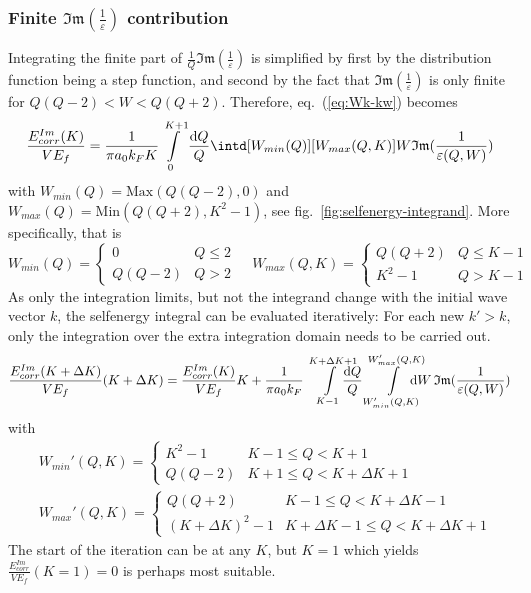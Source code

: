 \documentclass[physics,phd,nolot,nolof]{uccthesis}%
\begin{document}
{\subsubsection{Finite $\mathfrak{Im}(\frac{1}{\varepsilon})$ contribution}
Integrating the finite part of  $\frac{1}{Q}\mathfrak{Im}(\frac{1}{\varepsilon})$ is 
simplified by first by the distribution function being a step function,
and second by the fact that $\mathfrak{Im}(\frac{1}{\varepsilon})$ 
is only finite for $Q (Q-2) < W< Q(Q+2)$. 
Therefore, eq.~(\ref{eq:Wk-kw}) becomes
\begin{equation}
  \frac{ E_{corr}^{Im}(K)}{V E_f}= 
  \frac{1}{\pi a_0 k_F K} 
  \int\limits_{0}^{K+1}\frac{\mathrm{d}Q}{Q}
  \intd[W_{min}(Q)][W_{max}(Q,K)]W
  \mathfrak{Im}(\frac{1}{\varepsilon(Q,W)})
  \label{eq:Wk-T=0-finite}
\end{equation}
with 
$W_{min}(Q)= \text{Max}(Q(Q-2),0)$
and
$W_{max}(Q)= \text{Min}(Q(Q+2),K^2-1)$, see fig.~\ref{fig:selfenergy-integrand}.
More specifically, that is
\begin{equation}
  W_{min}(Q) =
  	\begin{cases}
	  	0	&	Q \leq 2\\
		Q(Q-2)	&	Q >2
  	\end{cases}
	\;\;\;\;
  W_{max}(Q,K) =
  	\begin{cases}
	  	Q(Q+2)	&	Q \leq K-1\\
		K^2-1	&	Q >K-1
  	\end{cases}
  \label{eq:wmin-max-T=0-finite-iminveps}
\end{equation}
As only the integration limits, but not the integrand change with the initial 
wave vector $k$, the selfenergy integral can be evaluated iteratively:
For each new $k'>k$, only the integration over the extra integration domain
needs to be carried out. 
\begin{equation}
  \frac{ E_{corr}^{Im}(K+\Delta K)}{V E_f}(K+\Delta K) = 
  \frac{ E_{corr}^{Im}(K)}{V E_f}K + 
  \frac{1}{\pi a_0 k_F} 
  \int\limits_{K-1}^{K+\Delta K+1}\mkern-20mu\frac{\mathrm{d}Q}{Q}
  \int\limits_{W_{min}'(Q,K)}^{W_{max}'(Q,K)}\mkern-20mu\mathrm{d}W\,
  \mathfrak{Im}(\frac{1}{\varepsilon(Q,W)})
  \label{eq:Wk-T=0-finite-iterative}
\end{equation}
with 
\begin{equation}
  \begin{split}
& W_{min}'(Q,K) =
  	\begin{cases}
	K^2-1	&	K-1 \leq Q < K+1\\
	Q(Q-2)	&	K+1 \leq Q < K+\Delta K+1
  	\end{cases}
	\\
& W_{max}'(Q,K) =
  	\begin{cases}
	 Q(Q+2)			&K-1		\leq Q < K+\Delta K -1\\
	(K+\Delta K)^2-1	&K+\Delta K-1	\leq Q <K+\Delta K+1
  	\end{cases}
  \end{split}
  \label{eq:wmin-max-T=0-finite-iteration}
\end{equation}
The start of the iteration can be at any $K$, but $K=1$ which yields
$\frac{ E_{corr}^{Im}}{V E_f}(K=1) =0 $ is perhaps most suitable.

}
\end{document}
